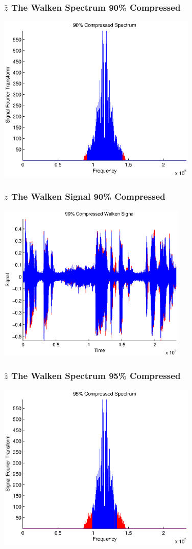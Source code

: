 \documentclass[10pt]{beamer}
\begin{document}
\begin{frame}
\frametitle{$\hat z$ The Walken Spectrum 90\% Compressed}
\includegraphics[height=8cm]{90four.eps}
\end{frame}

\begin{frame}
\frametitle{$z$ The Walken Signal 90\% Compressed}
\includegraphics[height=7.5cm]{90fourRec.eps}
\end{frame}


\begin{frame}
\frametitle{$\hat z$ The Walken Spectrum 95\% Compressed}
\includegraphics[height=8cm]{95four.eps}
\end{frame}
\end{document}
